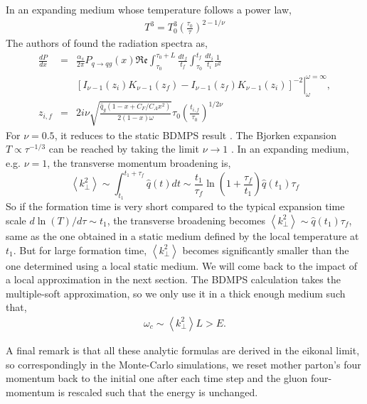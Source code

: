 \documentclass[aps, prc, reprint, amsmath, groupedaddress, nofootinbib]{revtex4-1}
\begin{document}
{In an expanding medium whose temperature follows a power law,
\begin{eqnarray}
T^3 = T_0^3\left(\frac{\tau_0}{\tau}\right)^{2-1/\nu}
\end{eqnarray}
The authors of \cite{Baier:1998yf} found the radiation spectra as,
\begin{eqnarray}
\frac{dP}{dx} &=& \frac{\alpha_s}{2\pi}P_{q\rightarrow qg}(x)\mathfrak{Re}\int_{\tau_0}^{\tau_0+L}\frac{dt_f}{t_f}\int_{\tau_0}^{t_f}\frac{dt_i}{t_i} \frac{1}{\nu^2}\\
\nonumber
&& \left.\left[ I_{\nu-1}(z_i)K_{\nu-1}(z_f)-I_{\nu-1}(z_f)K_{\nu-1}(z_i)\right]^{-2}\right|_{\omega}^{\omega=\infty},\\
z_{i,f} &=& 2i\nu \sqrt{\frac{\hat{q}_g(1-x+C_F/C_A x^2)}{2(1-x)\omega}} \tau_0 \left( \frac{t_{i,f}}{\tau_0}\right) ^{1/2\nu}
\end{eqnarray}
For $\nu=0.5$, it reduces to the static BDMPS result \cite{Baier:1996kr}. 
The Bjorken expansion $T \propto \tau^{-1/3}$ can be reached by taking the limit $\nu \rightarrow 1$ \cite{PhysRevD.27.140}.
In an expanding medium, e.g. $\nu=1$, the transverse momentum broadening is,
\begin{equation}\label{eq:expanding-kt2}
\left\langle k_\perp^2\right\rangle \sim \int_{t_1}^{t_1+\tau_f
}\hat{q}(t)dt \sim \frac{t_1}{\tau_f}  \ln\left(1+\frac{\tau_f}{t_1}\right) \hat{q}(t_1)\tau_f
\end{equation}
So if the formation time is very short compared to the typical expansion time scale $d\ln(T)/d\tau \sim t_1$, the transverse broadening becomes $\left\langle k_\perp^2\right\rangle \sim \hat{q}(t_1)\tau_f$, same as the one obtained in a static medium defined by the local temperature at $t_1$.
But for large formation time, $\left\langle k_\perp^2\right\rangle$ becomes significantly smaller than the one determined using a local static medium.
We will come back to the impact of a local approximation in the next section. 
The BDMPS calculation takes the multiple-soft approximation, so we only use it in a thick enough medium such that,
\begin{eqnarray}\label{eq:BDMPS-requrement}
\omega_c \sim \left\langle k_\perp^2 \right\rangle L > E.
\end{eqnarray}



A final remark is that all these analytic formulas are derived in the eikonal limit, so correspondingly in the Monte-Carlo simulations, we reset mother parton's four momentum back to the initial one after each time step and the gluon four-momentum is rescaled such that the energy is unchanged.



}
\end{document}
